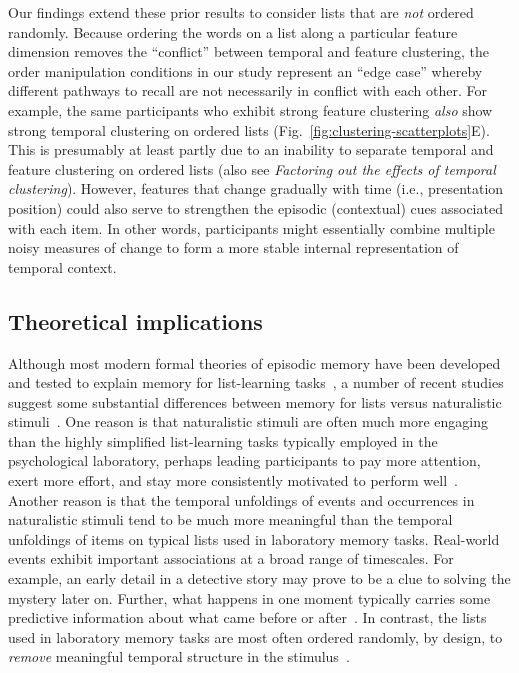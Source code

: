 \documentclass[11pt]{article}
\begin{document}
Our findings extend these prior results to consider lists that are \textit{not}
ordered randomly. Because ordering the words on a list along a particular
feature dimension removes the ``conflict'' between temporal and feature
clustering, the order manipulation conditions in our study represent an ``edge
case'' whereby different pathways to recall are not necessarily in conflict
with each other. For example, the same participants who exhibit strong feature
clustering \textit{also} show strong temporal clustering on ordered lists
(Fig.~\ref{fig:clustering-scatterplots}E). This is presumably at least partly
due to an inability to separate temporal and feature clustering on ordered
lists (also see \textit{Factoring out the effects of temporal clustering}).
However, features that change gradually with time (i.e., presentation position)
could also serve to strengthen the episodic (contextual) cues associated with
each item. In other words, participants might essentially combine multiple
noisy measures of change to form a more stable internal representation of
temporal context.



\subsection*{Theoretical implications}

Although most modern formal theories of episodic memory have been developed and
tested to explain memory for list-learning tasks~\citep{Kaha20}, a number of
recent studies suggest some substantial differences between memory for lists
versus naturalistic stimuli~\citep[e.g., real-world experiences, narratives,
films, etc.;][]{NastEtal20, HeusEtal21, Mann21a, LeeEtal20}. One reason is that
naturalistic stimuli are often much more engaging than the highly simplified
list-learning tasks typically employed in the psychological laboratory, perhaps
leading participants to pay more attention, exert more effort, and stay more
consistently motivated to perform well~\citep{NastEtal20}. Another reason is
that the temporal unfoldings of events and occurrences in naturalistic stimuli
tend to be much more meaningful than the temporal unfoldings of items on
typical lists used in laboratory memory tasks. Real-world events exhibit
important associations at a broad range of timescales. For example, an early
detail in a detective story may prove to be a clue to solving the mystery later
on. Further, what happens in one moment typically carries some predictive
information about what came before or after~\citep{XuEtal23}. In contrast, the
lists used in laboratory memory tasks are most often ordered randomly, by
design, to \textit{remove} meaningful temporal structure in the
stimulus~\citep{Kaha12}.
\end{document}
